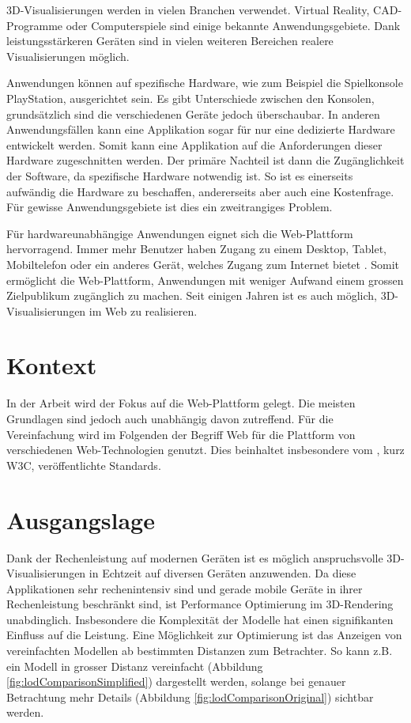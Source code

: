 
3D-Visualisierungen werden in vielen Branchen verwendet. Virtual Reality, CAD-Programme oder Computerspiele sind einige bekannte Anwendungsgebiete. Dank leistungsstärkeren Geräten sind in vielen weiteren Bereichen realere Visualisierungen möglich.

Anwendungen können auf spezifische Hardware, wie zum Beispiel die Spielkonsole PlayStation, ausgerichtet sein. Es gibt Unterschiede zwischen den Konsolen, grundsätzlich sind die verschiedenen Geräte jedoch überschaubar. In anderen Anwendungsfällen kann eine Applikation sogar für nur eine dedizierte Hardware entwickelt werden. Somit kann eine Applikation auf die Anforderungen dieser Hardware zugeschnitten werden. Der primäre Nachteil ist dann die Zugänglichkeit der Software, da spezifische Hardware notwendig ist. So ist es einerseits aufwändig die Hardware zu beschaffen, andererseits aber auch eine Kostenfrage. Für gewisse Anwendungsgebiete ist dies ein zweitrangiges Problem.

Für hardwareunabhängige Anwendungen eignet sich die Web-Plattform hervorragend.
Immer mehr Benutzer haben Zugang zu einem Desktop, Tablet, Mobiltelefon oder ein anderes Gerät, welches Zugang zum Internet bietet \cite{peopleWithInternetAccess}.
Somit ermöglicht die Web-Plattform, Anwendungen mit weniger Aufwand einem grossen Zielpublikum zugänglich zu machen.
Seit einigen Jahren ist es auch möglich, 3D-Visualisierungen im Web zu realisieren.

\section{Kontext}
In der Arbeit wird der Fokus auf die Web-Plattform gelegt. Die meisten Grundlagen sind jedoch auch unabhängig davon zutreffend.
Für die Vereinfachung wird im Folgenden der Begriff Web für die Plattform von verschiedenen Web-Technologien genutzt. Dies beinhaltet insbesondere vom , kurz W3C, veröffentlichte Standards.

\section{Ausgangslage}
Dank der Rechenleistung auf modernen Geräten ist es möglich anspruchsvolle 3D-Visualisierungen in Echtzeit auf diversen Geräten anzuwenden. Da diese Applikationen sehr rechenintensiv sind und gerade mobile Geräte in ihrer Rechenleistung beschränkt sind, ist Performance Optimierung im 3D-Rendering unabdinglich. Insbesondere die Komplexität der Modelle hat einen signifikanten Einfluss auf die Leistung.
Eine Möglichkeit zur Optimierung ist das Anzeigen von vereinfachten Modellen ab bestimmten Distanzen zum Betrachter. So kann z.B. ein Modell in grosser Distanz vereinfacht (Abbildung \ref{fig:lodComparisonSimplified}) dargestellt werden, solange bei genauer Betrachtung mehr Details (Abbildung \ref{fig:lodComparisonOriginal}) sichtbar werden.

